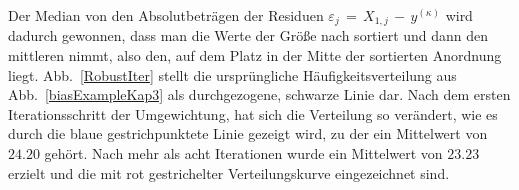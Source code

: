 Der Median von den Absolutbeträgen der Residuen $\varepsilon_j \, = \, X_{1,j} \, - \, y^{(\kappa)}$ wird dadurch gewonnen,
dass man die Werte der Größe nach sortiert und dann den mittleren nimmt, also den, auf dem Platz in der Mitte der sortierten
Anordnung liegt.
Abb.~\ref{RobustIter} stellt die ursprüngliche Häufigkeitsverteilung aus Abb.~\ref{biasExampleKap3} als
durchgezogene, schwarze Linie dar. Nach dem ersten Iterationsschritt der Umgewichtung, hat sich die Verteilung so verändert,
wie es durch die blaue gestrichpunktete Linie gezeigt wird, zu der ein Mittelwert von $24.20$ gehört. Nach mehr als acht Iterationen
wurde ein Mittelwert von $23.23$ erzielt und die mit rot gestrichelter Verteilungskurve eingezeichnet sind.
